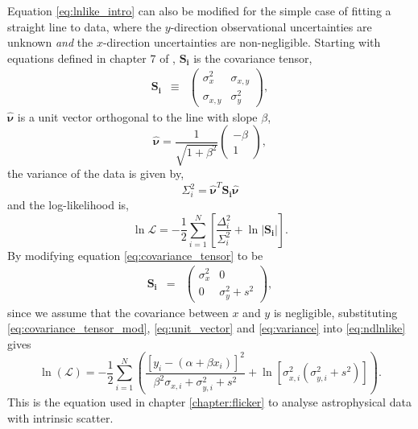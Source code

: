 Equation \ref{eq:lnlike_intro} can also be modified for the simple case of
fitting a straight line to data, where the $y$-direction observational
uncertainties are unknown {\it and} the $x$-direction uncertainties are
non-negligible.
Starting with equations defined in chapter 7 of \citet{Hogg2010b},
$\mathbf{S_i}$ is the covariance tensor,
\begin{eqnarray}
    \mathbf{S_i} &\equiv& \left( \begin{array}{cc}
                    \sigma_{x}^2 & \sigma_{x,y} \\
                    \sigma_{x,y} & \sigma_{y}^2
\end{array}\right),
\label{eq:covariance_tensor}
\end{eqnarray}
$\mathbf{\hat{\nu}}$ is a unit vector orthogonal to the line with slope
$\beta$,
\begin{equation}
    \mathbf{\hat{\nu}} = \frac{1}{\sqrt{1 + \beta^2}} \left( \begin{array}{c}
                                                    -\beta \\
                                                    1
    \end{array}\right),
\label{eq:unit_vector}
\end{equation}
the variance of the data is given by,
\begin{equation}
    \Sigma_i^2 = \mathbf{\hat{\nu}}^T \mathbf{S_i} \mathbf{\hat{\nu}}
\label{eq:variance}
\end{equation}
and the log-likelihood is,
\begin{equation}
    \ln\mathcal{L} = - \frac{1}{2} \sum_{i=1}^N \left[
    \frac{\Delta_i^2}{\Sigma_i^2} + \ln|\mathbf{S_i}| \right].
\label{eq:ndlnlike}
\end{equation}
By modifying equation \ref{eq:covariance_tensor} to be
\begin{eqnarray}
    \mathbf{S_i} &=& \left( \begin{array}{cc}
                    \sigma_{x}^2 & 0 \\
                    0 & \sigma_{y}^2 + s^2
\end{array}\right),
\label{eq:covariance_tensor_mod}
\end{eqnarray}
since we assume that the covariance between $x$ and $y$ is negligible,
substituting \ref{eq:covariance_tensor_mod}, \ref{eq:unit_vector} and
\ref{eq:variance} into \ref{eq:ndlnlike} gives
\begin{equation}
    \ln(\mathcal{L}) = -\frac{1}{2} \sum_{i=1}^N
    \left( \frac{\left[ y_i - (\alpha + \beta x_i) \right]^2}
    {\beta^2\sigma_{x, i} + \sigma_{y, i}^2 + s^2} + \ln[\sigma_{x,
    i}^2(\sigma_{y, i}^2 + s^2)]
    \right).
\end{equation}
This is the equation used in chapter \ref{chapter:flicker} to analyse
astrophysical data with intrinsic scatter.

